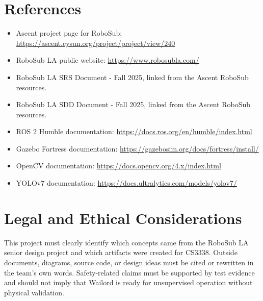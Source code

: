 \documentclass[12pt]{article}
\begin{document}
\section{References}
\begin{itemize}[leftmargin=*]
  \item Ascent project page for RoboSub: \url{https://ascent.cysun.org/project/project/view/240}
  \item RoboSub LA public website: \url{https://www.robosubla.com/}
  \item RoboSub LA SRS Document - Fall 2025, linked from the Ascent RoboSub resources.
  \item RoboSub LA SDD Document - Fall 2025, linked from the Ascent RoboSub resources.
  \item ROS 2 Humble documentation: \url{https://docs.ros.org/en/humble/index.html}
  \item Gazebo Fortress documentation: \url{https://gazebosim.org/docs/fortress/install/}
  \item OpenCV documentation: \url{https://docs.opencv.org/4.x/index.html}
  \item YOLOv7 documentation: \url{https://docs.ultralytics.com/models/yolov7/}
\end{itemize}

\section{Legal and Ethical Considerations}
This project must clearly identify which concepts came from the RoboSub LA senior design project and which artifacts were created for CS3338. Outside documents, diagrams, source code, or design ideas must be cited or rewritten in the team's own words. Safety-related claims must be supported by test evidence and should not imply that Wailord is ready for unsupervised operation without physical validation.
\end{document}
